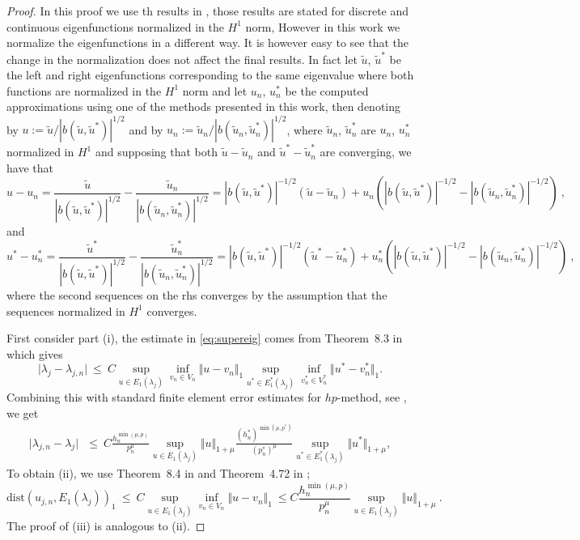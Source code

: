 \documentclass[smallextended]{svjour3}
\begin{document}
\begin{proof}

In this proof we use th results in \cite{babuska}, those results are stated for discrete and continuous eigenfunctions normalized in the $H^1$ norm, However in this work we normalize the eigenfunctions in a different way. It is however easy to see that the change in the normalization does not affect the final results. In fact let $\tilde u$, $\tilde u^*$ be the left and right eigenfunctions corresponding to the same eigenvalue where both functions are normalized in the $H^1$ norm and let $u_n$, $u_n^*$ be the computed approximations using one of the methods presented in this work, 
then
 denoting by $ u := \tilde u /|b(\tilde u,\tilde u^*)|^{1/2}$ and by 
$ u_n := \tilde u_n/|b(\tilde u_n,\tilde u_n^*)|^{1/2}$, where $\tilde u_n$, $\tilde u_n^*$ are $u_n$, $u_n^*$ normalized in $H^1$  and supposing that both $\tilde u-\tilde u_n$ and $\tilde u^*-\tilde u_n^*$ are converging, we have that
$$
u - u_n = \frac{\tilde u}{|b(\tilde u,\tilde u^*)|^{1/2}}-\frac{\tilde u_n}{|b(\tilde u_n,\tilde u_n^*)|^{1/2}} =
|b(\tilde u,\tilde u^*)|^{-1/2}(\tilde u-\tilde u_n)+ u_n( |b(\tilde u,\tilde u^*)|^{-1/2}- |b(\tilde u_n,\tilde u_n^*)|^{-1/2})\ ,
$$
and
$$
u^* - u_n^* = \frac{\tilde u^*}{|b(\tilde u,\tilde u^*)|^{1/2}}-\frac{\tilde u_n^*}{|b(\tilde u_n,\tilde u_n^*)|^{1/2}} =
|b(\tilde u,\tilde u^*)|^{-1/2}(\tilde u^*-\tilde u_n^*)+ u_n^*( |b(\tilde u,\tilde u^*)|^{-1/2}- |b(\tilde u_n,\tilde u_n^*)|^{-1/2})\ ,
$$
where the second sequences on the rhs converges by the assumption that the sequences normalized in $H^1$ converges.


First consider part (i), the estimate in \eqref{eq:supereig} comes from  
Theorem~8.3 in \cite{babuska} which gives  
$$ 
\vert \lambda_j - \lambda_{j,n} \vert \ \leq \  C \sup_{u \in
  E_1(\lambda_j)} \inf_{v_n \in V_n} \Vert u - v_n \Vert_1 \sup_{u^* \in
  E_1^*(\lambda_j)} \inf_{v_n^* \in V_n^*} \Vert u^* - v_n^* \Vert_1. 
  $$
Combining this with standard finite element error
estimates for $hp$-method, see \cite[Theorem~4.72]{schwab}, we get  
\begin{eqnarray}
\vert \lambda_{j,n} - \lambda_j \vert \  \  
\ \leq \ C \frac{h_n^{\min(\mu,p)} }{p_n^{\mu}} \sup_{u \in
  E_1(\lambda_j)} \Vert u \Vert_{1+\mu}\frac{(h_n^*)^{\min(\mu,p^*)} }{(p_n^*)^{\mu}} \sup_{u^* \in
  E_1^*(\lambda_j)} \Vert u^* \Vert_{1+\mu} ,  \label{eq:second_est} 
  \end{eqnarray}
To obtain  (ii), we use Theorem~8.4 in \cite{babuska} and Theorem~4.72 in \cite{schwab};
$$
\mathrm{dist}(
u_{j,n},E_1(\lambda_j))_{1}\ \leq \  C \sup_{u \in
  E_1(\lambda_j)} \inf_{v_n \in V_n} \Vert u - v_n \Vert_1 \ \leq
C \frac{h_n^{\min(\mu,p)} }{p_n^{\mu}} \sup_{u \in
  E_1(\lambda_j)} \Vert u \Vert_{1+\mu}\ .
$$
The proof of (iii) is analogous to (ii).
\end{proof}
\end{document}
